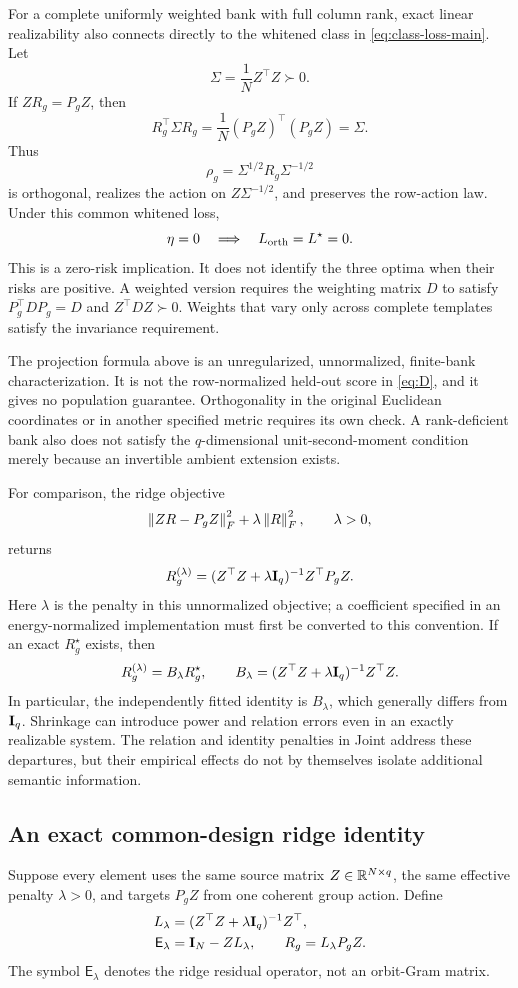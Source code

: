 For a complete uniformly weighted bank with full column
rank, exact linear realizability also connects directly
to the whitened class in \cref{eq:class-loss-main}.
Let
\[
 \Sigma=\frac1N Z^\top Z\succ0.
\]
If $ZR_g=P_gZ$, then
\[
 R_g^\top\Sigma R_g
 =\frac1N(P_gZ)^\top(P_gZ)
 =\Sigma.
\]
Thus
\[
 \rho_g=\Sigma^{1/2}R_g\Sigma^{-1/2}
\]
is orthogonal, realizes the action on $Z\Sigma^{-1/2}$,
and preserves the row-action law.
Under this common whitened loss,
\[
 \eta=0
 \quad\Longrightarrow\quad
 L_{\rm orth}=L^\star=0.
\]
This is a zero-risk implication.
It does not identify the three optima when their risks
are positive.
A weighted version requires the weighting matrix $D$ to
satisfy $P_g^\top DP_g=D$ and
$Z^\top DZ\succ0$.
Weights that vary only across complete templates satisfy
the invariance requirement.

The projection formula above is an unregularized,
unnormalized, finite-bank characterization.
It is not the row-normalized held-out score in
\cref{eq:D}, and it gives no population guarantee.
Orthogonality in the original Euclidean coordinates or
in another specified metric requires its own check.
A rank-deficient bank also does not satisfy the
$q$-dimensional unit-second-moment condition merely
because an invertible ambient extension exists.

For comparison, the ridge objective
\[
 \left\lVert ZR-P_gZ\right\rVert_F^2+\lambda\left\lVert R\right\rVert_F^2,
 \qquad \lambda>0,
\]
returns
\[
 R_g^{(\lambda)}
 =(Z^\top Z+\lambda\mathbf{I}_q)^{-1}Z^\top P_gZ.
\]
Here $\lambda$ is the penalty in this unnormalized
objective; a coefficient specified in an
energy-normalized implementation must first be converted
to this convention.
If an exact $R_g^\star$ exists, then
\[
 R_g^{(\lambda)}=B_\lambda R_g^\star,
 \qquad
 B_\lambda
 =(Z^\top Z+\lambda\mathbf{I}_q)^{-1}Z^\top Z.
\]
In particular, the independently fitted identity is
$B_\lambda$, which generally differs from $\mathbf{I}_q$.
Shrinkage can introduce power and relation errors even
in an exactly realizable system.
The relation and identity penalties in Joint address
these departures, but their empirical effects do not
by themselves isolate additional semantic information.


\subsection{An exact common-design ridge identity}
\label{app:ridge-identity}

Suppose every element uses the same source matrix
$Z\in\mathbb{R}^{N\times q}$, the same effective penalty
$\lambda>0$, and targets $P_gZ$ from one coherent group
action.
Define
\begin{align*}
 L_\lambda
 &=(Z^\top Z+\lambda\mathbf{I}_q)^{-1}Z^\top,\\
 \mathsf E_\lambda
 &=\mathbf{I}_N-ZL_\lambda,
 \qquad
 R_g=L_\lambda P_gZ.
\end{align*}
The symbol $\mathsf E_\lambda$ denotes the ridge residual
operator, not an orbit-Gram matrix.

